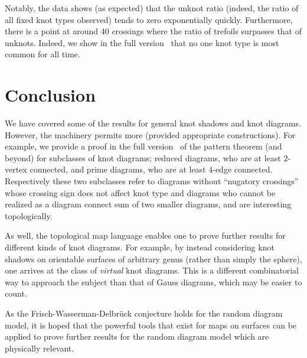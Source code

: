 \documentclass[submission%
]{dmtcs}
\begin{document}
Notably, the data shows (as expected) that the unknot ratio (indeed,
the ratio of all fixed knot types observed) tends to zero
exponentially quickly. Furthermore, there is a point at around 40
crossings where the ratio of trefoils surpasses that of
unknots. Indeed, we show in the full version~\cite{chapman2015} that
no one knot type is most common for all time.

\section{Conclusion}
\label{sec:conclusion}

We have covered some of the results for general knot shadows and knot
diagrams. However, the machinery permits more (provided appropriate
constructions). For example, we provide a proof in the full
version~\cite{chapman2015} of the pattern theorem (and beyond) for
subclasses of knot diagrams; reduced diagrams, who are at least
$2$-vertex connected, and prime diagrams, who are at least $4$-edge
connected. Respectively these two subclasses refer to diagrams without
``nugatory crossings'' whose crossing sign does not affect knot type
and diagrams who cannot be realized as a diagram connect sum of two
smaller diagrams, and are interesting topologically.

As well, the topological map language enables one to prove further
results for different kinds of knot diagrams. For example, by instead
considering knot shadows on orientable surfaces of arbitrary genus
(rather than simply the sphere), one arrives at the class of
\emph{virtual} knot diagrams. This is a different combinatorial way to
approach the subject than that of Gauss diagrams, which may be easier
to count.

As the Frisch-Wasserman-Delbr\"uck conjecture holds for the random
diagram model, it is hoped that the powerful tools that exist for maps
on surfaces can be applied to prove further results for the random
diagram model which are physically relevant.


%

\label{sec:biblio}
\end{document}
